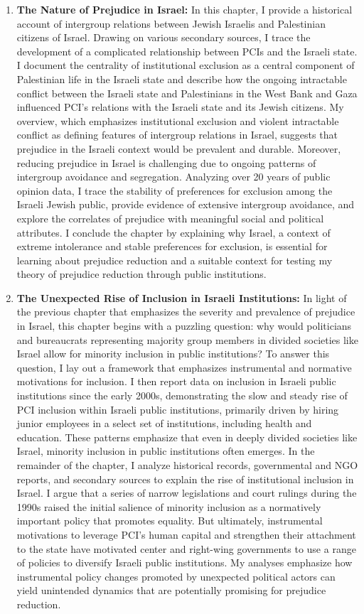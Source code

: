 \documentclass[12pt]{article}
\theoremstyle{plain}
\begin{document}
\begin{enumerate}
\item \textbf{The Nature of Prejudice in Israel:} In this chapter, I provide a historical account of intergroup relations between Jewish Israelis and Palestinian citizens of Israel. Drawing on various secondary sources, I trace the development of a complicated relationship between PCIs and the Israeli state. I document the centrality of institutional exclusion as a central component of Palestinian life in the Israeli state and describe how the ongoing intractable conflict between the Israeli state and Palestinians in the West Bank and Gaza influenced PCI's relations with the Israeli state and its Jewish citizens. My overview, which emphasizes institutional exclusion and violent intractable conflict as defining features of intergroup relations in Israel, suggests that prejudice in the Israeli context would be prevalent and durable. Moreover, reducing prejudice in Israel is challenging due to ongoing patterns of intergroup avoidance and segregation. Analyzing over 20 years of public opinion data, I trace the stability of preferences for exclusion among the Israeli Jewish public, provide evidence of extensive intergroup avoidance, and explore the correlates of prejudice with meaningful social and political attributes. I conclude the chapter by explaining why Israel, a context of extreme intolerance and stable preferences for exclusion, is essential for learning about prejudice reduction and a suitable context for testing my theory of prejudice reduction through public institutions.


\item \textbf{The Unexpected Rise of Inclusion in Israeli Institutions:} In light of the previous chapter that emphasizes the severity and prevalence of prejudice in Israel, this chapter begins with a puzzling question: why would politicians and bureaucrats representing majority group members in divided societies like Israel allow for minority inclusion in public institutions? To answer this question, I lay out a framework that emphasizes instrumental and normative motivations for inclusion. I then report data on inclusion in Israeli public institutions since the early 2000s, demonstrating the slow and steady rise of PCI inclusion within Israeli public institutions, primarily driven by hiring junior employees in a select set of institutions, including health and education. These patterns emphasize that even in deeply divided societies like Israel, minority inclusion in public institutions often emerges. In the remainder of the chapter, I analyze historical records, governmental and NGO reports, and secondary sources to explain the rise of institutional inclusion in Israel. I argue that a series of narrow legislations and court rulings during the 1990s raised the initial salience of minority inclusion as a normatively important policy that promotes equality. But ultimately, instrumental motivations to leverage PCI's human capital and strengthen their attachment to the state have motivated center and right-wing governments to use a range of policies to diversify Israeli public institutions. My analyses emphasize how instrumental policy changes promoted by unexpected political actors can yield unintended dynamics that are potentially promising for prejudice reduction.


\end{enumerate}
\end{document}

